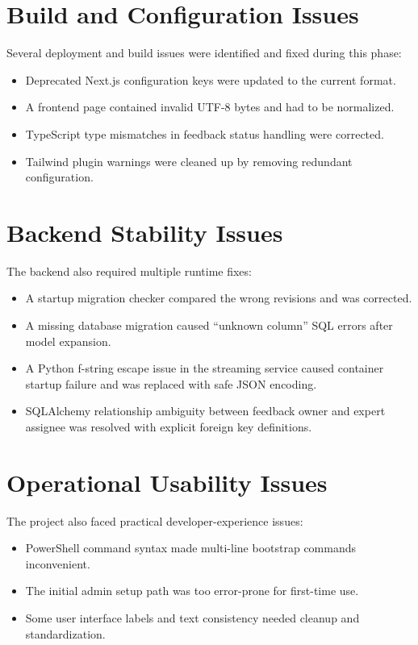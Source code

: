 \documentclass[12pt,a4paper]{report}
\begin{document}
\section{Build and Configuration Issues}

Several deployment and build issues were identified and fixed during this phase:
\begin{itemize}[leftmargin=1.5em]
\item Deprecated Next.js configuration keys were updated to the current format.
\item A frontend page contained invalid UTF-8 bytes and had to be normalized.
\item TypeScript type mismatches in feedback status handling were corrected.
\item Tailwind plugin warnings were cleaned up by removing redundant configuration.
\end{itemize}

\section{Backend Stability Issues}

The backend also required multiple runtime fixes:
\begin{itemize}[leftmargin=1.5em]
\item A startup migration checker compared the wrong revisions and was corrected.
\item A missing database migration caused ``unknown column'' SQL errors after model expansion.
\item A Python f-string escape issue in the streaming service caused container startup failure and was replaced with safe JSON encoding.
\item SQLAlchemy relationship ambiguity between feedback owner and expert assignee was resolved with explicit foreign key definitions.
\end{itemize}

\section{Operational Usability Issues}

The project also faced practical developer-experience issues:
\begin{itemize}[leftmargin=1.5em]
\item PowerShell command syntax made multi-line bootstrap commands inconvenient.
\item The initial admin setup path was too error-prone for first-time use.
\item Some user interface labels and text consistency needed cleanup and standardization.
\end{itemize}
\end{document}
